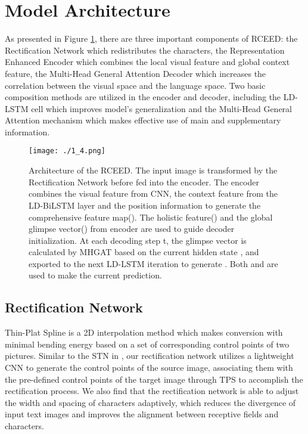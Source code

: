 \documentclass[runningheads]{llncs}
\begin{document}
\section{Model Architecture}
As presented in Figure \ref{Fig.1}, there are three important components of RCEED: the Rectification Network which redistributes the characters, the Representation Enhanced Encoder which combines the local visual feature and global context feature, the Multi-Head General Attention Decoder which increases the correlation between the visual space and the language space. Two basic composition methods are utilized in the encoder and decoder, including the LD-LSTM cell which improves model's generalization and the Multi-Head General Attention mechanism which makes effective use of main and supplementary information.
\begin{figure}
\vspace{-0.3cm}
\setlength{\belowcaptionskip}{-0.5cm}
\texttt{[image: ./1\_4.png]}
\caption{Architecture of the RCEED. The input image is transformed by the Rectification Network before fed into the encoder. The encoder combines the visual feature from CNN, the context feature from the LD-BiLSTM layer and the position information to generate the comprehensive feature map(). The holistic feature() and the global glimpse vector() from encoder are used to guide decoder initialization. At each decoding step t, the glimpse vector  is calculated by MHGAT based on the current hidden state , and exported to the next LD-LSTM iteration to generate . Both  and  are used to make the current prediction.} 
\label{Fig.1}
\end{figure}
\subsection{Rectification Network}
Thin-Plat Spline\cite{bookstein1993thin} is a 2D interpolation method which makes conversion with minimal bending energy based on a set of corresponding control points of two pictures. Similar to the STN in \cite{shi2018aster}, our rectification network utilizes a lightweight CNN to generate the control points of the source image, associating them with the pre-defined control points of the target image through TPS to accomplish the rectification process. We also find that the rectification network is able to adjust the width and spacing of characters adaptively, which reduces the divergence of input text images and improves the alignment between receptive fields and characters.
\end{document}
